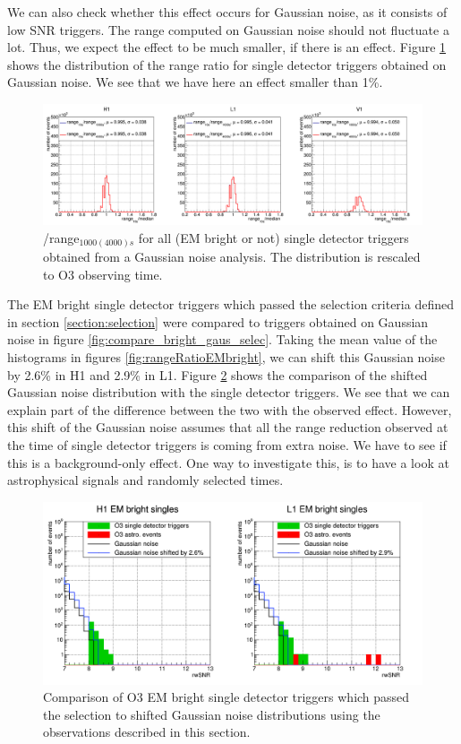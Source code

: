 We can also check whether this effect occurs for Gaussian noise, as it consists of low SNR triggers.
The range computed on Gaussian noise should not fluctuate a lot.
Thus, we expect the effect to be much smaller, if there is an effect.
Figure \ref{fig:rangeRatioGaus} shows the distribution of the range ratio for single detector triggers obtained on Gaussian noise.
We see that we have here an effect smaller than 1\%.
\begin{figure}[H]
  \centering
  \includegraphics[width=\linewidth]{sectionBadTriggers/PSD/Range/range_ratio/cRatioMed_Gaus.png}
  \caption{\medr{}/range$_{1000(4000)s}$ for all (EM bright or not) single detector triggers obtained from a Gaussian noise analysis. The distribution is rescaled to O3 observing time.}
  \label{fig:rangeRatioGaus}
\end{figure}

The EM bright single detector triggers which passed the selection criteria defined in section \ref{section:selection} were compared to triggers obtained on Gaussian noise in figure \ref{fig:compare_bright_gaus_selec}.
Taking the mean value of the histograms in figures \ref{fig:rangeRatioEMbright}, we can shift this Gaussian noise by 2.6\% in H1 and 2.9\% in L1.
Figure \ref{fig:shiftGausBright} shows the comparison of the shifted Gaussian noise distribution with the single detector triggers.
We see that we can explain part of the difference between the two with the observed effect.
However, this shift of the Gaussian noise assumes that all the range reduction observed at the time of single detector triggers is coming from extra noise.
We have to see if this is a background-only effect.
One way to investigate this, is to have a look at astrophysical signals and randomly selected times.
\begin{figure}[H]
  \centering
  \includegraphics[width=\linewidth]{sectionBadTriggers/PSD/Reweight/cBrightGausShift.png}
  \caption{Comparison of O3 EM bright single detector triggers which passed the selection to shifted Gaussian noise distributions using the observations described in this section.}
  \label{fig:shiftGausBright}
\end{figure}

